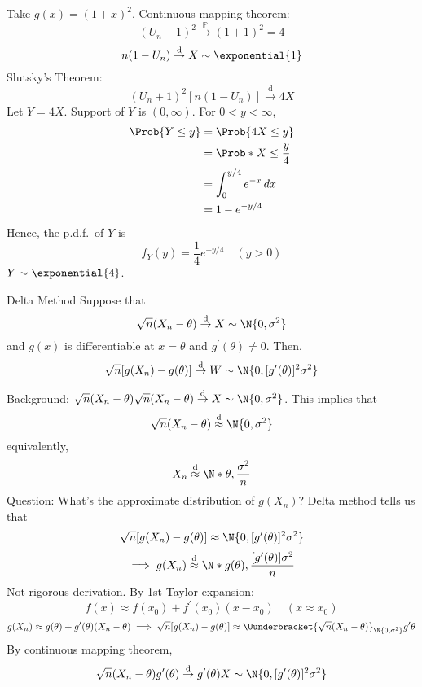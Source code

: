 \begin{Example}{}{}
\begin{enumerate}[label=(\roman*)]
              Take $ g(x)=(1+x)^2 $. Continuous mapping theorem:
              \[ (U_n+1)^2\stackrel{\mathbb{P}}{\to}(1+1)^2=4 \]
              \[ n(1-U_n)\stackrel{\text{d}}{\to}X \sim \exponential{1} \]
              Slutsky's Theorem:
              \[ (U_n+1)^2[n(1-U_n)]\stackrel{\text{d}}{\to}4X \]
              Let $ Y=4X $. Support of $ Y $ is $ (0,\infty) $.
              For $ 0<y<\infty $,
              \begin{align*}
                  \Prob{Y\le y}
                   & =\Prob{4X\le y}               \\
                   & =\Prob*{X\le \frac{y}{4}}     \\
                   & =\int_{0}^{y/4}e^{-x} \, d{x} \\
                   & =1-e^{-y/4}
              \end{align*}
              Hence, the p.d.f.\ of $ Y $ is
              \[ f_Y(y)=\frac{1}{4} e^{-y/4}\quad (y>0) \]
              $ Y \sim \exponential{4} $.
    \end{enumerate}
\end{Example}
\begin{Theorem}{Delta Method}{}
    Suppose that
    \[ \sqrt{n}(X_n-\theta)
        \stackrel{\text{d}}{\to}X \sim \N{0,\sigma^2} \]
    and $ g(x) $ is differentiable at $ x=\theta $
    and $ g^{\prime}(\theta)\ne 0 $. Then,
    \[ \sqrt{n}[g(X_n)-g(\theta)]\stackrel{\text{d}}{\to}W \sim \N{0,
            [g^{\prime}(\theta)]^2\sigma^2} \]
\end{Theorem}
Background: $ \sqrt{n}(X_n-\theta)\sqrt{n}(X_n-\theta)
    \stackrel{\text{d}}{\to}X \sim \N{0,\sigma^2} $.
This implies that
\[ \sqrt{n}(X_n-\theta)\stackrel{\text{d}}{\approx}
    \N{0,\sigma^2} \]
equivalently,
\[ X_n\stackrel{\text{d}}{\approx}\N*{\theta,\frac{\sigma^2}{n}} \]
Question: What's the approximate distribution of $ g(X_n) $?
Delta method tells us that
\[ \sqrt{n}[g(X_n)-g(\theta)] \approx\N{0,
        [g^{\prime}(\theta)]^2\sigma^2} \]
\[ \implies g(X_n)\stackrel{\text{d}}{\approx}
    \N*{g(\theta),\frac{[g^\prime(\theta)]\sigma^2}{n} } \]
Not rigorous derivation. By 1st Taylor
expansion:
\[ f(x)\approx f(x_0)+f^\prime(x_0)(x-x_0)\quad (x\approx x_0) \]
\[ g(X_n)\approx g(\theta)+g^\prime(\theta)(X_n-\theta)\implies
    \sqrt{n}[g(X_n)-g(\theta)]\approx
    \Uunderbracket{\sqrt{n}(X_n-\theta)}_{\N{0,\sigma^2}}
    g^\prime \theta \]
By continuous mapping theorem,
\[ \sqrt{n}(X_n-\theta)g^\prime(\theta)
    \stackrel{\text{d}}{\to} g^\prime(\theta)X \sim \N{
        0,[g^\prime(\theta)]^2\sigma^2
    } \]

